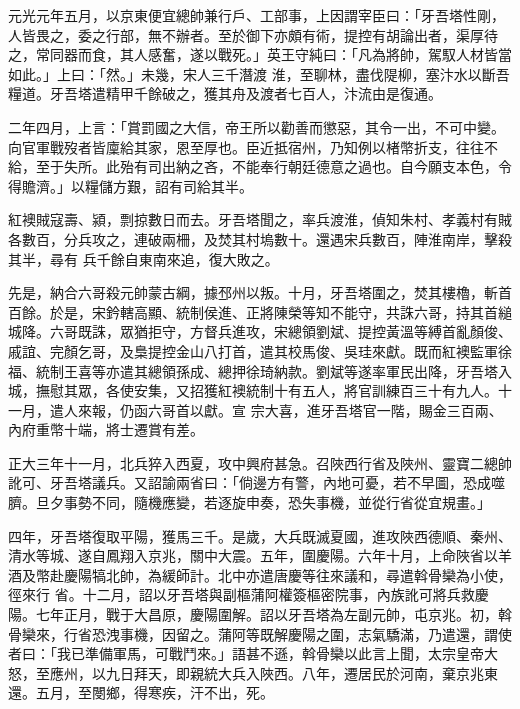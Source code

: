 \begin{pinyinscope}
 元光元年五月，以京東便宜總帥兼行戶、工部事，上因謂宰臣曰：「牙吾塔性剛，人皆畏之，委之行部，無不辦者。至於御下亦頗有術，提控有胡論出者，渠厚待之，常同器而食，其人感奮，遂以戰死。」英王守純曰：「凡為將帥，駕馭人材皆當如此。」上曰：「然。」未幾，宋人三千潛渡
 淮，至聊林，盡伐隄柳，塞汴水以斷吾糧道。牙吾塔遣精甲千餘破之，獲其舟及渡者七百人，汴流由是復通。



 二年四月，上言：「賞罰國之大信，帝王所以勸善而懲惡，其令一出，不可中變。向官軍戰歿者皆廩給其家，恩至厚也。臣近抵宿州，乃知例以楮幣折支，往往不給，至于失所。此殆有司出納之吝，不能奉行朝廷德意之過也。自今願支本色，令得贍濟。」以糧儲方艱，詔有司給其半。



 紅襖賊寇壽、潁，剽掠數日而去。牙吾塔聞之，率兵渡淮，偵知朱村、孝義村有賊各數百，分兵攻之，連破兩柵，及焚其村塢數十。還遇宋兵數百，陣淮南岸，擊殺其半，尋有
 兵千餘自東南來追，復大敗之。



 先是，納合六哥殺元帥蒙古綱，據邳州以叛。十月，牙吾塔圍之，焚其樓櫓，斬首百餘。於是，宋鈐轄高顯、統制侯進、正將陳榮等知不能守，共誅六哥，持其首縋城降。六哥既誅，眾猶拒守，方督兵進攻，宋總領劉斌、提控黃溫等縛首亂顏俊、戚誼、完顏乞哥，及梟提控金山八打首，遣其校馬俊、吳珪來獻。既而紅襖監軍徐福、統制王喜等亦遣其總領孫成、總押徐琦納款。劉斌等遂率軍民出降，牙吾塔入城，撫慰其眾，各使安集，又招獲紅襖統制十有五人，將官訓練百三十有九人。十一月，遣人來報，仍函六哥首以獻。宣
 宗大喜，進牙吾塔官一階，賜金三百兩、內府重幣十端，將士遷賞有差。



 正大三年十一月，北兵猝入西夏，攻中興府甚急。召陜西行省及陜州、靈寶二總帥訛可、牙吾塔議兵。又詔諭兩省曰：「倘邊方有警，內地可憂，若不早圖，恐成噬臍。旦夕事勢不同，隨機應變，若逐旋申奏，恐失事機，並從行省從宜規畫。」



 四年，牙吾塔復取平陽，獲馬三千。是歲，大兵既滅夏國，進攻陜西德順、秦州、清水等城、遂自鳳翔入京兆，關中大震。五年，圍慶陽。六年十月，上命陜省以羊酒及幣赴慶陽犒北帥，為緩師計。北中亦遣唐慶等往來議和，尋遣斡骨欒為小使，徑來行
 省。十二月，詔以牙吾塔與副樞蒲阿權簽樞密院事，內族訛可將兵救慶陽。七年正月，戰于大昌原，慶陽圍解。詔以牙吾塔為左副元帥，屯京兆。初，斡骨欒來，行省恐洩事機，因留之。蒲阿等既解慶陽之圍，志氣驕滿，乃遣還，謂使者曰：「我已準備軍馬，可戰鬥來。」語甚不遜，斡骨欒以此言上聞，太宗皇帝大怒，至應州，以九日拜天，即親統大兵入陜西。八年，遷居民於河南，棄京兆東還。五月，至閿鄉，得寒疾，汗不出，死。




\end{pinyinscope}
